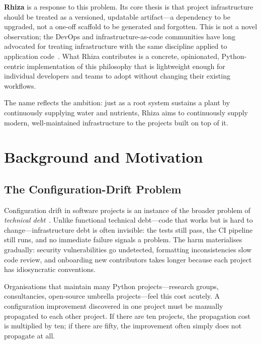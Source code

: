\documentclass[12pt,a4paper]{article}
\begin{document}
\textbf{Rhiza} is a response to this problem. Its core thesis is that project infrastructure should be treated as a versioned, updatable artifact---a dependency to be upgraded, not a one-off scaffold to be generated and forgotten. This is not a novel observation; the DevOps and infrastructure-as-code communities have long advocated for treating infrastructure with the same discipline applied to application code~\cite{humble2010continuous,fowler2016infrastructure}. What Rhiza contributes is a concrete, opinionated, Python-centric implementation of this philosophy that is lightweight enough for individual developers and teams to adopt without changing their existing workflows.

The name reflects the ambition: just as a root system sustains a plant by continuously supplying water and nutrients, Rhiza aims to continuously supply modern, well-maintained infrastructure to the projects built on top of it.

\section{Background and Motivation}
\label{sec:motivation}

\subsection{The Configuration-Drift Problem}

Configuration drift in software projects is an instance of the broader problem of \emph{technical debt}~\cite{cunningham1992wycash}. Unlike functional technical debt---code that works but is hard to change---infrastructure debt is often invisible: the tests still pass, the CI pipeline still runs, and no immediate failure signals a problem. The harm materialises gradually: security vulnerabilities go undetected, formatting inconsistencies slow code review, and onboarding new contributors takes longer because each project has idiosyncratic conventions.

Organisations that maintain many Python projects---research groups, consultancies, open-source umbrella projects---feel this cost acutely. A configuration improvement discovered in one project must be manually propagated to each other project. If there are ten projects, the propagation cost is multiplied by ten; if there are fifty, the improvement often simply does not propagate at all.
\end{document}
